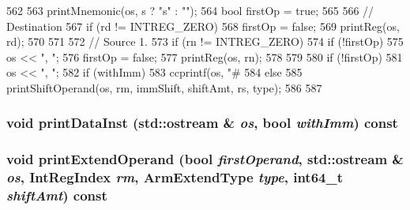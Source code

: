 \begin{DoxyCode}
562 {
563     printMnemonic(os, s ? "s" : "");
564     bool firstOp = true;
565 
566     // Destination
567     if (rd != INTREG_ZERO) {
568         firstOp = false;
569         printReg(os, rd);
570     }
571 
572     // Source 1.
573     if (rn != INTREG_ZERO) {
574         if (!firstOp)
575             os << ", ";
576         firstOp = false;
577         printReg(os, rn);
578     }
579 
580     if (!firstOp)
581         os << ", ";
582     if (withImm) {
583         ccprintf(os, "#%
584     } else {
585         printShiftOperand(os, rm, immShift, shiftAmt, rs, type);
586     }
587 }
\end{DoxyCode}
\hypertarget{classArmISA_1_1ArmStaticInst_a4acc01aec616addcddc2958cff18ec04}{
\subsubsection[{printDataInst}]{\setlength{\rightskip}{0pt plus 5cm}void printDataInst (std::ostream \& {\em os}, \/  bool {\em withImm}) const}}
\label{classArmISA_1_1ArmStaticInst_a4acc01aec616addcddc2958cff18ec04}
\hypertarget{classArmISA_1_1ArmStaticInst_a911f1c2066f7df1b82ea71902f97e6d0}{
\subsubsection[{printExtendOperand}]{\setlength{\rightskip}{0pt plus 5cm}void printExtendOperand (bool {\em firstOperand}, \/  std::ostream \& {\em os}, \/  {\bf IntRegIndex} {\em rm}, \/  {\bf ArmExtendType} {\em type}, \/  int64\_\-t {\em shiftAmt}) const}}
\label{classArmISA_1_1ArmStaticInst_a911f1c2066f7df1b82ea71902f97e6d0}




